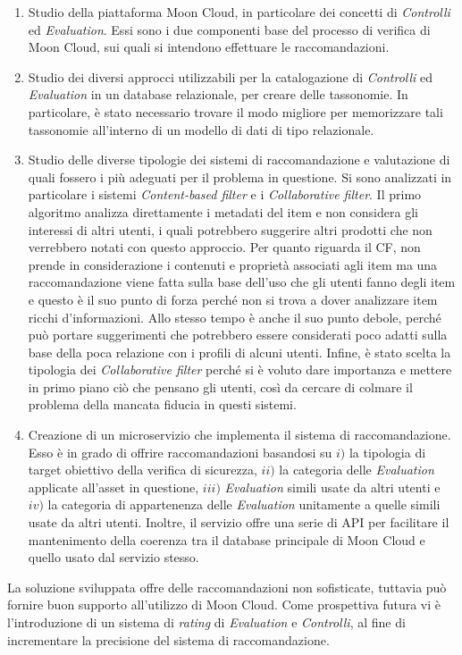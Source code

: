 \documentclass[10pt,a4paper]{article}
\begin{document}
\begin{enumerate}
    \item Studio della piattaforma Moon Cloud, in particolare dei concetti di \textit{Controlli} ed \textit{Evaluation}. 
    Essi sono i due componenti base del processo di verifica di Moon Cloud, sui quali si intendono effettuare le raccomandazioni.
    \item Studio dei diversi approcci utilizzabili per la catalogazione di \textit{Controlli} ed \textit{Evaluation} in un database 
    relazionale, per creare delle tassonomie. In particolare, è stato necessario trovare il modo migliore per memorizzare tali tassonomie all'interno 
    di un modello di dati di tipo relazionale.
    \item Studio delle diverse tipologie dei sistemi di raccomandazione e valutazione di quali fossero i più adeguati per il problema in questione. 
    Si sono analizzati in particolare i sistemi \textit{Content-based filter} e i \textit{Collaborative filter}.\hfill\break
    Il primo algoritmo analizza direttamente i metadati del item e non considera gli interessi di altri utenti, i quali potrebbero 
    suggerire altri prodotti che non verrebbero notati con questo approccio. 
    Per quanto riguarda il CF, non prende in considerazione i contenuti e proprietà associati agli item ma una raccomandazione 
    viene fatta sulla base dell'uso che gli utenti fanno degli item e questo è il suo punto 
    di forza perché non si trova a dover analizzare item ricchi d’informazioni. Allo stesso tempo è anche il suo punto debole, perché può 
    portare suggerimenti che potrebbero essere considerati poco adatti sulla base della poca relazione con i profili di alcuni utenti.\hfill\break
    Infine, è stato scelta la tipologia dei \textit{Collaborative filter} perché si è voluto dare importanza e mettere in primo piano ciò che 
    pensano gli utenti, così da cercare di colmare il problema della mancata fiducia in questi sistemi. 
    \item Creazione di un microservizio che implementa il sistema di raccomandazione. Esso è in grado di offrire raccomandazioni basandosi 
    su $i)$ la tipologia di target obiettivo della verifica di sicurezza, $ii)$ la categoria delle \textit{Evaluation} applicate all’asset in questione, 
    $iii)$ \textit{Evaluation} simili usate da altri utenti e $iv)$ la categoria di appartenenza delle \textit{Evaluation} unitamente a quelle simili 
    usate da altri utenti. Inoltre, il servizio offre una serie di API per facilitare il mantenimento della coerenza tra il database principale di 
    Moon Cloud e quello usato dal servizio stesso.
\end{enumerate}
%
La soluzione sviluppata offre delle raccomandazioni non sofisticate, tuttavia può fornire buon supporto all'utilizzo di Moon Cloud. Come prospettiva futura 
vi è l'introduzione di un sistema di \textit{rating} di \textit{Evaluation} e \textit{Controlli}, al fine di incrementare la precisione del sistema di 
raccomandazione.
\end{document}
